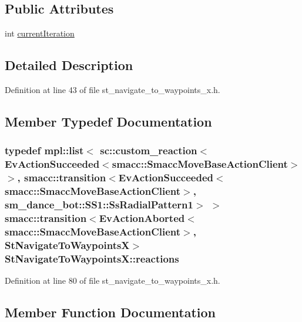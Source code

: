 \subsection*{Public Attributes}
\begin{DoxyCompactItemize}
\item 
int \hyperlink{structStNavigateToWaypointsX_a2f597fd0ee0258ef66506e98d55e8060}{current\+Iteration}
\end{DoxyCompactItemize}


\subsection{Detailed Description}


Definition at line 43 of file st\+\_\+navigate\+\_\+to\+\_\+waypoints\+\_\+x.\+h.



\subsection{Member Typedef Documentation}
\subsubsection[{\texorpdfstring{reactions}{reactions}}]{\setlength{\rightskip}{0pt plus 5cm}typedef mpl\+::list$<$ sc\+::custom\+\_\+reaction$<$Ev\+Action\+Succeeded$<${\bf smacc\+::\+Smacc\+Move\+Base\+Action\+Client}$>$ $>$, {\bf smacc\+::transition}$<$Ev\+Action\+Succeeded$<${\bf smacc\+::\+Smacc\+Move\+Base\+Action\+Client}$>$, {\bf sm\+\_\+dance\+\_\+bot\+::\+S\+S1\+::\+Ss\+Radial\+Pattern1}$>$ $>$ {\bf smacc\+::transition}$<$Ev\+Action\+Aborted$<${\bf smacc\+::\+Smacc\+Move\+Base\+Action\+Client}$>$, {\bf St\+Navigate\+To\+WaypointsX}$>$ {\bf St\+Navigate\+To\+Waypoints\+X\+::reactions}}\hypertarget{structStNavigateToWaypointsX_abaf7552998d2bc53a05123da220fa17e}{}\label{structStNavigateToWaypointsX_abaf7552998d2bc53a05123da220fa17e}


Definition at line 80 of file st\+\_\+navigate\+\_\+to\+\_\+waypoints\+\_\+x.\+h.



\subsection{Member Function Documentation}
